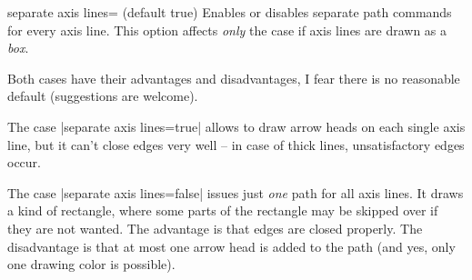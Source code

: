 \begin{pgfplotskey}{separate axis lines= (default true)}
	Enables or disables separate path commands for every axis line. This option affects \emph{only} the case if axis lines are drawn as a \emph{box}.

	Both cases have their advantages and disadvantages, I fear there is no reasonable default (suggestions are welcome).

	The case |separate axis lines=true| allows to draw arrow heads on each single axis line, but it can't close edges very well -- in case of thick lines, unsatisfactory edges occur.
\begin{codeexample}[]
\end{codeexample}

	The case |separate axis lines=false| issues just \emph{one} path for all axis lines. It draws a kind of rectangle, where some parts of the rectangle may be skipped over if they are not wanted. The advantage is that edges are closed properly. The disadvantage is that at most one arrow head is added to the path (and yes, only one drawing color is possible).
\begin{codeexample}[]
\end{codeexample}
\end{pgfplotskey}


